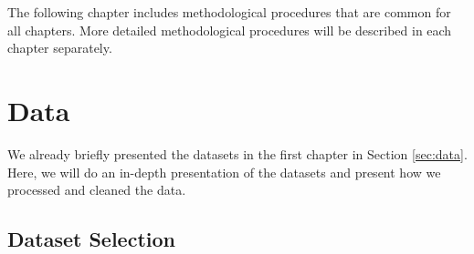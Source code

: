 The following chapter includes methodological procedures that are common for all chapters.
More detailed methodological procedures will be described in each chapter separately. 

\section{Data}
\label{ssec:data}
We already briefly presented the datasets in the first chapter in Section \ref{sec:data}.
Here, we will do an in-depth presentation of the datasets and present how we processed and cleaned the data. 

\subsection{Dataset Selection}

